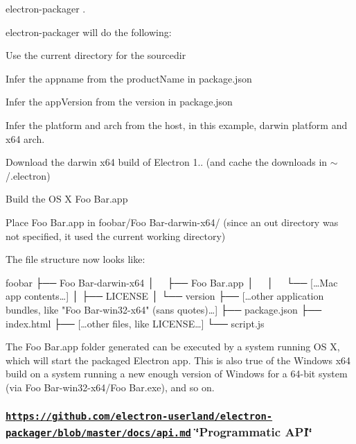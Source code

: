 \begin{DoxyCode}
electron-packager .
\end{DoxyCode}


{\ttfamily electron-\/packager} will do the following\+:


\begin{DoxyItemize}
\item Use the current directory for the {\ttfamily sourcedir}
\item Infer the {\ttfamily appname} from the {\ttfamily product\+Name} in {\ttfamily package.\+json}
\item Infer the {\ttfamily app\+Version} from the {\ttfamily version} in {\ttfamily package.\+json}
\item Infer the {\ttfamily platform} and {\ttfamily arch} from the host, in this example, {\ttfamily darwin} platform and {\ttfamily x64} arch.
\item Download the darwin x64 build of Electron 1.. (and cache the downloads in {\ttfamily $\sim$/.electron})
\item Build the OS X {\ttfamily Foo Bar.\+app}
\item Place {\ttfamily Foo Bar.\+app} in {\ttfamily foobar/\+Foo Bar-\/darwin-\/x64/} (since an {\ttfamily out} directory was not specified, it used the current working directory)
\end{DoxyItemize}

The file structure now looks like\+:


\begin{DoxyCode}
foobar
├── Foo Bar-darwin-x64
│   ├── Foo Bar.app
│   │   └── […Mac app contents…]
│   ├── LICENSE
│   └── version
├── […other application bundles, like "Foo Bar-win32-x64" (sans quotes)…]
├── package.json
├── index.html
├── […other files, like LICENSE…]
└── script.js
\end{DoxyCode}


The {\ttfamily Foo Bar.\+app} folder generated can be executed by a system running OS X, which will start the packaged Electron app. This is also true of the Windows x64 build on a system running a new enough version of Windows for a 64-\/bit system (via {\ttfamily Foo Bar-\/win32-\/x64/\+Foo Bar.\+exe}), and so on.

\subsubsection*{\href{https://github.com/electron-userland/electron-packager/blob/master/docs/api.md}{\tt https\+://github.\+com/electron-\/userland/electron-\/packager/blob/master/docs/api.\+md} \char`\"{}\+Programmatic A\+P\+I\char`\"{}}

